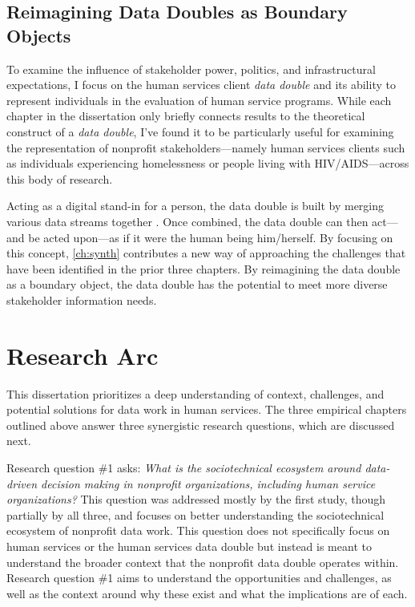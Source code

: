 \subsection{Reimagining Data Doubles as Boundary Objects}
To examine the influence of stakeholder power, politics, and infrastructural expectations, I focus on the human services client \textit{data double} and its ability to represent individuals in the evaluation of human service programs. While each chapter in the dissertation only briefly connects results to the theoretical construct of a \textit{data double}, I've found it to be particularly useful for examining the representation of nonprofit stakeholders---namely human services clients such as individuals experiencing homelessness or people living with HIV/AIDS---across this body of research. 

Acting as a digital stand-in for a person, the data double is built by merging various data streams together \citep{Haggerty2006New,Raley2013Dataveillance}. Once combined, the data double can then act---and be acted upon---as if it were the human being him/herself. By focusing on this concept, \autoref{ch:synth} contributes a new way of approaching the challenges that have been identified in the prior three chapters. By reimagining the data double as a boundary object, the data double has the potential to meet more diverse stakeholder information needs.

\section{Research Arc}
This dissertation prioritizes a deep understanding of context, challenges, and potential solutions for data work in human services. The three empirical chapters outlined above answer three synergistic research questions, which are discussed next.

Research question \#1 asks: \emph{What is the sociotechnical ecosystem around data-driven decision making in nonprofit organizations, including human service organizations?} This question was addressed mostly by the first study, though partially by all three, and focuses on better understanding the sociotechnical ecosystem of nonprofit data work. This question does not specifically focus on human services or the human services data double but instead is meant to understand the broader context that the nonprofit data double operates within. Research question \#1 aims to understand the opportunities and challenges, as well as the context around why these exist and what the implications are of each. 

